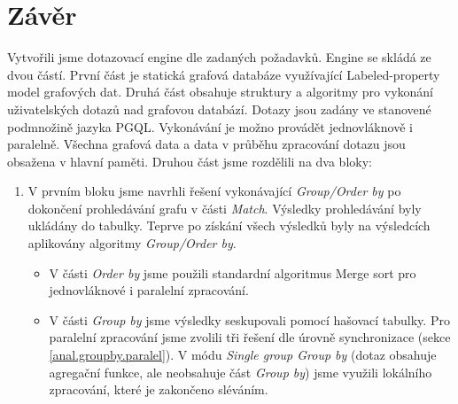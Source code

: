 \chapter*{Závěr}

Vytvořili jsme dotazovací engine dle zadaných požadavků.
Engine se skládá ze dvou částí.
První část je statická grafová databáze využívající Labeled-property model grafových dat. 
Druhá část obsahuje struktury a algoritmy pro vykonání uživatelských dotazů nad grafovou databází.
Dotazy jsou zadány ve stanovené podmnožině jazyka PGQL.
Vykonávání je možno provádět jednovláknově i paralelně.
Všechna grafová data a data v průběhu zpracování dotazu jsou obsažena v hlavní paměti.
Druhou část jsme rozdělili na dva bloky:
\begin{enumerate}
\item
V prvním bloku jsme navrhli řešení vykonávající \textit{Group/Order by} po dokončení prohledávání grafu v části \textit{Match}.
Výsledky prohledávání byly ukládány do tabulky.
Teprve po získání všech výsledků byly na výsledcích aplikovány algoritmy \textit{Group/Order by}.
\begin{itemize}
\item V části \textit{Order by} jsme použili standardní algoritmus Merge sort pro jednovláknové i paralelní zpracování.
\item V části \textit{Group by} jsme výsledky seskupovali pomocí hašovací tabulky.
Pro paralelní zpracování jsme zvolili tři řešení dle úrovně synchronizace (sekce \ref{anal.groupby.paralel}).
V módu \textit{Single group Group by} (dotaz obsahuje agregační funkce, ale neobsahuje část \textit{Group by}) jsme využili lokálního zpracování, které je zakončeno sléváním.
\end{itemize}


\end{enumerate}
